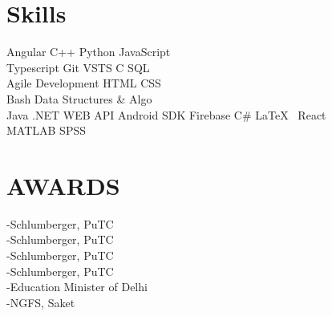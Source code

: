 \documentclass[a4paper]{deedy-resume-openfont}
\begin{document}
\begin{minipage}[t]{0.33\textwidth}
\section{Skills}
Angular \textbullet{}   C++ \textbullet{} Python \textbullet{} JavaScript \textbullet{}\\
Typescript \textbullet{} Git \textbullet{} VSTS \textbullet{} C \textbullet{} SQL \textbullet{}\\ 
Agile Development \textbullet{} HTML \textbullet{} CSS \textbullet{} \\
Bash \textbullet{} Data Structures \& Algo \\
Java \textbullet{} .NET WEB API \textbullet{} Android SDK \textbullet{} Firebase \textbullet{} C\# \textbullet{} \LaTeX\  \textbullet{} React\\
MATLAB \textbullet{} SPSS 
\sectionsep



\section{AWARDS}
\textbullet{}  -Schlumberger, PuTC \\
\textbullet{}  -Schlumberger, PuTC \\
\textbullet{}  -Schlumberger, PuTC \\
\textbullet{}  -Schlumberger, PuTC \\
\textbullet{}  -Education Minister of Delhi \\
\textbullet{}  -NGFS, Saket \\
\sectionsep


\end{minipage}
\end{document}
